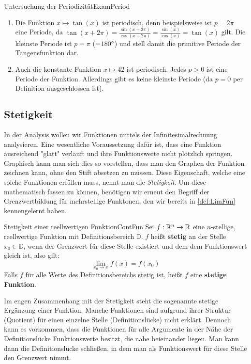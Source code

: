 \begin{example}{Untersuchung der Periodizität}{ExamPeriod}
    \begin{enumerate}
        \item Die Funktion $x \mapsto \tan(x)$ ist periodisch, denn beispielsweise ist $p=2\pi$ eine Periode, da $\tan(x+2\pi)=\frac{\sin(x+2\pi)}{\cos(x+2\pi)} = \frac{\sin(x)}{\cos(x)} = \tan(x)$ gilt. Die kleinste Periode ist $p=\pi$ (=$\SI{180}{\degree}$) und stell damit die primitive Periode der Tangensfunktion dar.
        \item Auch die konstante Funktion $x \mapsto 42$ ist periodisch. Jedes $p>0$ ist eine Periode der Funktion. Allerdings gibt es keine kleinste Periode (da $p=0$ per Definition ausgeschlossen ist).
    \end{enumerate}
\end{example}

\subsection{Stetigkeit}

In der Analysis wollen wir Funktionen mittels der Infinitesimalrechnung analysieren. Eine wesentliche Voraussetzung dafür ist, dass eine Funktion ausreichend "glatt" verläuft und ihre Funktionswerte nicht plötzlich springen. Graphisch kann man sich dies so vorstellen, dass man den Graphen der Funktion zeichnen kann, ohne den Stift absetzen zu müssen. Diese Eigenschaft, welche eine solche Funktionen erfüllen muss, nennt man die \emph{Stetigkeit}. Um diese mathematisch fassen zu können, benötigen wir erneut den Begriff der Grenzwertbildung für mehrstellige Funktonen, den wir bereits in \ref{def:LimFun} kennengelernt haben.

\begin{definition}{Stetigkeit einer reellwertigen Funktion}{ContFun}
    Sei $f: \mathbb{R}^n \to \mathbb{R}$ eine $n$-stellige, reellwertige Funktion mit Definitionsbereich $\mathbb{D}$. $f$ heißt \textbf{stetig} an der Stelle $x_0\in\mathbb{D}$, wenn der Grenzwert für diese Stelle existiert und dem dem Funktionswert gleich ist, also gilt:
    $$
        \lim\limits_{x_0\to x} f(x) = f(x_0)
    $$
    Falls $f$ für alle Werte des Definitionsbereichs stetig ist, heißt $f$ eine \textbf{stetige Funktion}.
\end{definition}

Im engen Zusammenhang mit der Stetigkeit steht die sogenannte stetige Ergänzung einer Funktion. Manche Funktionen sind aufgrund ihrer Struktur (Quotient) für einen einzelne Stelle (Definitionslücke) nicht erklärt. Dennoch kann es vorkommen, dass die Funktionen für alle Argumente in der Nähe der Definitionslücke Funktionswerte besitzt, die nahe beieinander liegen. Man kann dann die Definitionslücke schließen, in dem man als Funktionswert für diese Stelle den Grenzwert nimmt.

